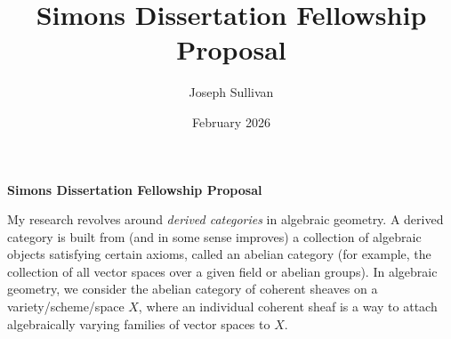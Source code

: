 \documentclass[12pt]{article}
\title{Simons Dissertation Fellowship Proposal}
\author{Joseph Sullivan}
\date{February 2026}
\begin{document}
{\large\textbf{Simons Dissertation Fellowship Proposal}}







My research revolves around \textit{derived categories} in algebraic geometry. A derived category is built from (and in some sense improves) a collection of algebraic objects satisfying certain axioms, called an abelian category (for example, the collection of all vector spaces over a given field or abelian groups). In algebraic geometry, we consider the abelian category of coherent sheaves on a variety/scheme/space $X$, where an individual coherent sheaf is a way to attach algebraically varying families of vector spaces to $X$.
\end{document}
